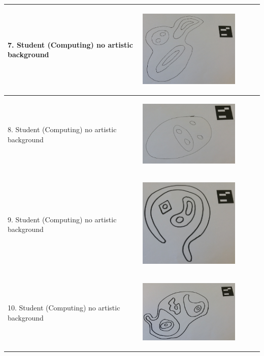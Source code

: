 \documentclass[11pt]{article}
\begin{document}
\begin{landscape}
\begin{longtable}{p{}| p{}| p{} | p{} |p{}}
\hline
7. Student (Computing)
	no artistic background & \begin{center}\includegraphics[scale=0.5]{pics/usertesting/7.png}\end{center} 
							& \begin{center}\end{center} & \\
\hline
8. Student (Computing)
	no artistic background & \begin{center}\includegraphics[scale=0.5]{pics/usertesting/8.png}\end{center} 
							& \begin{center}\end{center} & \\
\hline
9. Student (Computing)
	no artistic background & \begin{center}\includegraphics[scale=0.5]{pics/usertesting/9.png}\end{center} 
							& \begin{center}\end{center} & \\
\hline
10. Student (Computing)
	no artistic background & \begin{center}\includegraphics[scale=0.5]{pics/usertesting/10.png}\end{center} 

\end{longtable}
\end{landscape}
\end{document}
